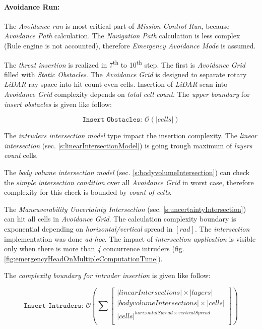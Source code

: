 \paragraph{Avoidance Run:} The \emph{Avoidance run} is most critical part of \emph{Mission Control Run}, because \emph{Avoidance Path} calculation. The \emph{Navigation Path} calculation is less complex (Rule engine is not accounted), therefore \emph{Emergency Avoidance Mode} is assumed. 

The \emph{threat insertion} is realized in 7\textsuperscript{th} to 10\textsuperscript{th} step. The first is \emph{Avoidance Grid} filled with \emph{Static Obstacles}. The \emph{Avoidance Grid} is designed to separate rotary  \emph{LiDAR} ray space into hit count even cells. Insertion of \emph{LiDAR} scan into \emph{Avoidance Grid} complexity depends on \emph{total cell count}. The \emph{upper boundary} for \emph{insert obstacles} is given like follow:

\begin{equation*}
    \texttt{Insert Obstacles: } \mathscr{O}(|cells|)
\end{equation*}

The \emph{intruders intersection model} type impact the insertion complexity. The \emph{linear intersection} (sec. \ref{s:linearIntersectionModel}) is going trough maximum of \emph{layers count} cells. 

The \emph{body volume intersection model} (sec. \ref{s:bodyvolumeIntersection}) can check the \emph{simple intersection condition} over all \emph{Avoidance Grid} in worst case, therefore complexity for this check is bounded by \emph{count of cells}. 

The \emph{Maneuverability Uncertainty Intersection} (sec. \ref{s:uncertaintyIntersection}) can hit all cells in \emph{Avoidance Grid}. The calculation complexity boundary is exponential depending on \emph{horizontal/vertical} spread in $[rad]$. The \emph{intersection} implementation was done \emph{ad-hoc}. The impact of \emph{intersection application} is visible only when there is more than \emph{4} concurrence intruders (fig. \ref{fig:emergencyHeadOnMultipleComputationTime}).

The \emph{complexity boundary for \emph{intruder insertion}} is given like follow:

\begin{equation*}
    \texttt{Insert Intruders: }
    \mathscr{O}\left(\sum \begin{bmatrix}
        |linear Intersections| \times |layers|\\
        |body volume Intersections| \times  |cells|\\
        |cells|^{horizontal Spread \times vertical Spread}\\
    \end{bmatrix}\right)
\end{equation*}

